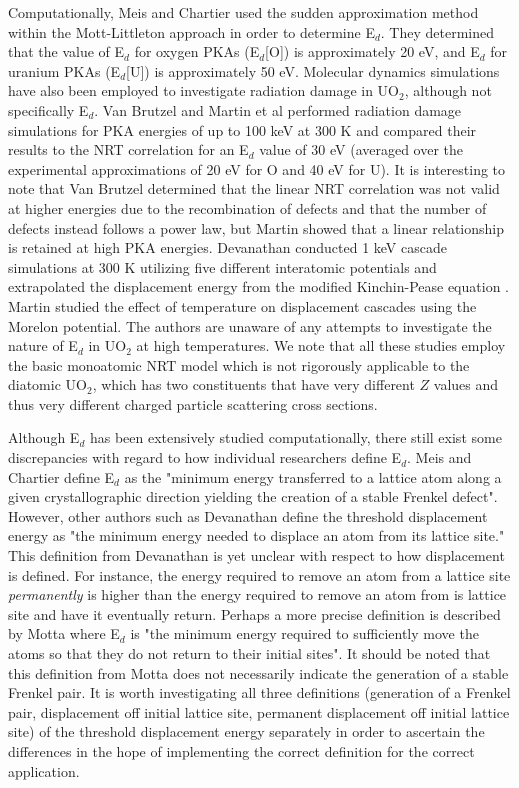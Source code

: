 \documentclass[review]{elsarticle}
\begin{document}
Computationally, Meis and Chartier \cite{meis2005} used the sudden approximation method within the Mott-Littleton approach \cite{Litt} in order to determine E$_d$. They determined that the value of E$_d$ for oxygen PKAs (E$_d$[O]) is approximately 20 eV, and E$_d$ for uranium PKAs (E$_d$[U]) is approximately 50 eV. Molecular dynamics simulations have also been employed to investigate radiation damage in UO$_2$, although not specifically E$_d$. Van Brutzel \cite{vanbrutzel2003,vanbrutzel2006} and Martin et al \cite{martin2011} performed radiation damage simulations for PKA energies of up to 100 keV at 300 K and compared their results to the NRT correlation for an E$_d$ value of 30 eV (averaged over the experimental approximations of 20 eV for O and 40 eV for U). It is interesting to note that Van Brutzel determined that the linear NRT correlation was not valid at higher energies due to the recombination of defects and that the number of defects instead follows a power law, but Martin showed that a linear relationship is retained at high PKA energies. Devanathan \cite{devanathan2009} conducted 1 keV cascade simulations at 300 K utilizing five different interatomic potentials and extrapolated the displacement energy from the modified Kinchin-Pease equation \cite{kinchinpease}. Martin \cite{martin2015, martin2014} studied the effect of temperature on displacement cascades using the Morelon \cite{morelon2003} potential. The authors are unaware of any attempts to investigate the nature of E$_d$ in UO$_2$ at high temperatures. We note that all these studies employ the basic monoatomic NRT model which is not rigorously applicable to the diatomic UO$_2$, which has two constituents that have very different $Z$ values and thus very different charged particle scattering cross sections.

Although E$_d$ has been extensively studied computationally, there still exist some discrepancies with regard to how individual researchers define E$_d$. Meis and Chartier \cite{meis2005} define E$_d$ as the "minimum energy transferred to a lattice atom along a given crystallographic direction yielding the creation of a stable Frenkel defect". However, other authors such as Devanathan \cite{devanathan1998} define the threshold displacement energy as "the minimum energy needed to displace an atom from its lattice site." This definition from Devanathan is yet unclear with respect to how displacement is defined. For instance, the energy required to remove an atom from a lattice site \textit{permanently} is higher than the energy required to remove an atom from is lattice site and have it eventually return. Perhaps a more precise definition is described by Motta \cite{Motta} where E$_d$ is "the minimum energy required to sufficiently move the atoms so that they do not return to their initial sites". It should be noted that this definition from Motta does not necessarily indicate the generation of a stable Frenkel pair. It is worth investigating all three definitions (generation of a Frenkel pair, displacement off initial lattice site, permanent displacement off initial lattice site) of the threshold displacement energy separately in order to ascertain the differences in the hope of implementing the correct definition for the correct application.
\end{document}
